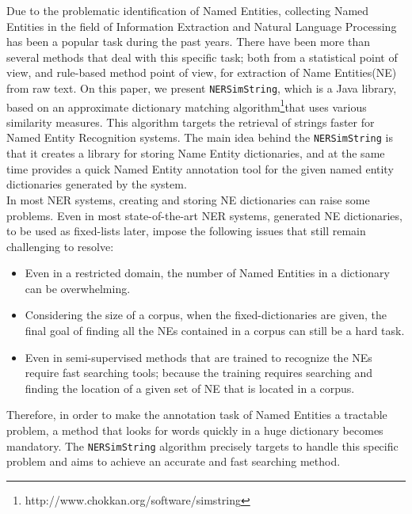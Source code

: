 
Due to the problematic identification of Named Entities, collecting Named Entities in the field of Information Extraction and Natural Language Processing has been a popular task during the past years. There have been more than several methods that deal with this specific task; both from a statistical point of view, and rule-based method point of view, for extraction of Name Entities(NE) from raw text. On this paper, we present \texttt{NERSimString}, which is a Java library, based on an approximate dictionary matching algorithm\cite{Okazaki:Coling2010}\footnote{http://www.chokkan.org/software/simstring}that uses various similarity measures. This algorithm targets the retrieval of strings faster for Named Entity Recognition systems. The main idea behind the \texttt{NERSimString} is that it creates a library for storing Name Entity dictionaries, and at the same time provides a quick Named Entity annotation tool for the given named entity dictionaries generated by the system.\\

In most NER systems, creating  and storing NE dictionaries can raise some problems. Even in most state-of-the-art NER systems, generated NE dictionaries, to be used as fixed-lists later, impose the following issues that still remain challenging to resolve:
\begin{itemize}
	\item Even in a restricted domain, the number of Named Entities in a dictionary can be overwhelming.
	\item Considering the size of a corpus, when the fixed-dictionaries are given, the final goal of finding all the NEs contained in a corpus can still be a hard task.  
	\item Even in semi-supervised methods that are trained to recognize the NEs require fast searching tools; because the training requires searching and finding the location of a given set of NE that is located in a corpus.
\end{itemize}

Therefore, in order to make the annotation task of Named Entities a tractable problem, a method that looks for words quickly in a huge dictionary becomes mandatory. The \texttt{NERSimString} algorithm precisely targets to handle this specific problem and aims to achieve an accurate and fast searching method.
